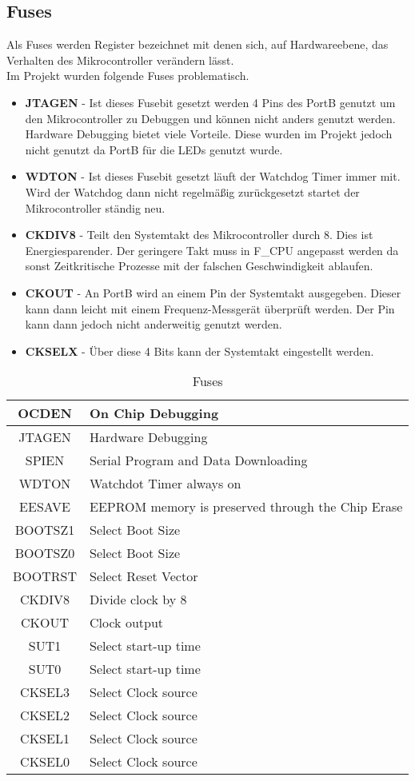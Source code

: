 \subsection{Fuses}
Als Fuses werden Register bezeichnet mit denen sich, auf Hardwareebene, das Verhalten des Mikrocontroller verändern lässt. \\
Im Projekt wurden folgende Fuses problematisch.
\begin{itemize}
\item \textbf{JTAGEN} - Ist dieses Fusebit gesetzt werden 4 Pins des PortB genutzt um den Mikrocontroller zu Debuggen und können nicht anders genutzt werden. Hardware Debugging bietet viele Vorteile. Diese wurden im Projekt jedoch nicht genutzt da PortB für die LEDs genutzt wurde.
\item \textbf{WDTON} - Ist dieses Fusebit gesetzt läuft der Watchdog Timer immer mit. Wird der Watchdog dann nicht regelmäßig zurückgesetzt startet der Mikrocontroller ständig neu.
\item \textbf{CKDIV8} - Teilt den Systemtakt des Mikrocontroller durch 8. Dies ist Energiesparender. Der geringere Takt muss in F\_CPU angepasst werden da sonst Zeitkritische Prozesse mit der falschen Geschwindigkeit ablaufen.
\item \textbf{CKOUT} - An PortB wird an einem Pin der Systemtakt ausgegeben. Dieser kann dann leicht mit einem Frequenz-Messgerät überprüft werden. Der Pin kann dann jedoch nicht anderweitig genutzt werden.
\item \textbf{CKSELX} - Über diese 4 Bits kann der Systemtakt eingestellt werden.
\end{itemize}
\begin{longtable}{|c|l|} 
\caption{Fuses} \\
\hline
\label{tab:TD_VI-910}
OCDEN & On Chip Debugging \\ \hline 
JTAGEN & Hardware Debugging \\ \hline 
SPIEN & Serial Program and Data Downloading \\ \hline 
WDTON & Watchdot Timer always on \\ \hline 
EESAVE & EEPROM memory is preserved through the Chip Erase \\ \hline 
BOOTSZ1 & Select Boot Size \\ \hline 
BOOTSZ0 & Select Boot Size \\ \hline 
BOOTRST & Select Reset Vector \\ \hline 
CKDIV8 & Divide clock by 8 \\ \hline 
CKOUT & Clock output \\ \hline 
SUT1 & Select start-up time \\ \hline 
SUT0 & Select start-up time \\ \hline 
CKSEL3 & Select Clock source \\ \hline 
CKSEL2 & Select Clock source \\ \hline 
CKSEL1 & Select Clock source \\ \hline 
CKSEL0 & Select Clock source \\ \hline 
\end{longtable} 



